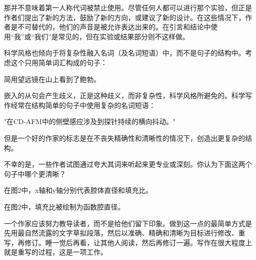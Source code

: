 那并不意味着第一人称代词被禁止使用。尽管任何人都可以进行那个实验，但正是作者们提出了新的方法，鼓励了新的方向，或建议了新的设计。在这些情况下，作者是不可替代的，他们的声音是被允许表达出来的。在引言和结论中使用“我”或“我们”是常见的，但在实验或结果部分则不这样做。

科学风格也倾向于将复杂性融入名词（及名词短语）中，而不是句子的结构中。考虑这个只用简单词汇构成的句子：

简用望远镜在山上看到了鲍勃。

嵌入的从句会产生歧义，正是这种歧义，而非复杂性，科学风格所避免的。科学写作经常在结构简单的句子中使用复杂的名词短语：

"在CD-AFM中的侧壁感应涉及到探针持续的横向抖动。"

但是一个好的作家的标志是在不丧失精确性和清晰性的情况下，创造出更复杂的结构。

不幸的是，一些作者试图通过夸大其词来听起来更专业或深刻。你认为下面这两个句子中哪个更清晰？

在图2中，x轴和y轴分别代表腔体直径和填充比。

在图2中，填充比被绘制为函数腔直径。

一个作家应该努力教导读者，而不是给他们留下印象。做到这一点的最简单方式是先用最自然流露的文字草拟段落，然后以准确、精确和清晰为目标进行修改、重写，再修订。睡一觉后再看，让其他人阅读，然后再修订一遍。写作在很大程度上就是重写的过程，这是一项工作。

